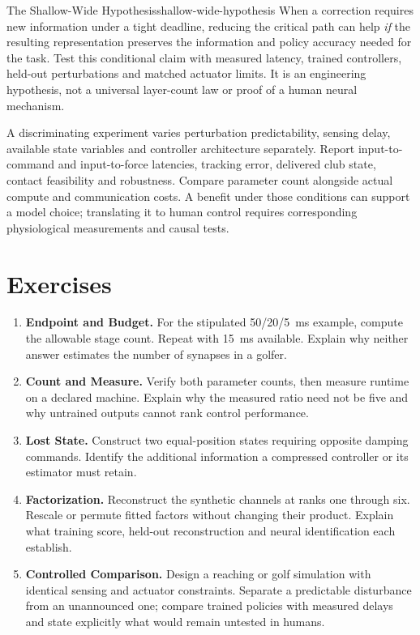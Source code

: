 \begin{insight}{The Shallow-Wide Hypothesis}{shallow-wide-hypothesis}
When a correction requires new information under a tight deadline, reducing the
critical path can help \emph{if} the resulting representation preserves the
information and policy accuracy needed for the task. Test this conditional
claim with measured latency, trained controllers, held-out perturbations and
matched actuator limits. It is an engineering hypothesis, not a universal
layer-count law or proof of a human neural mechanism.
\end{insight}

A discriminating experiment varies perturbation predictability, sensing delay,
available state variables and controller architecture separately. Report
input-to-command and input-to-force latencies, tracking error, delivered club
state, contact feasibility and robustness. Compare parameter count alongside
actual compute and communication costs. A benefit under those conditions can
support a model choice; translating it to human control requires corresponding
physiological measurements and causal tests.

\section*{Exercises}
\begin{enumerate}
 \item \textbf{Endpoint and Budget.} For the stipulated 50/20/5~ms example,
 compute the allowable stage count. Repeat with 15~ms available. Explain
 why neither answer estimates the number of synapses in a golfer.
 \item \textbf{Count and Measure.} Verify both parameter counts, then measure
 runtime on a declared machine. Explain why the measured ratio need not be
 five and why untrained outputs cannot rank control performance.
 \item \textbf{Lost State.} Construct two equal-position states requiring
 opposite damping commands. Identify the additional information a compressed
 controller or its estimator must retain.
 \item \textbf{Factorization.} Reconstruct the synthetic channels at ranks one
 through six. Rescale or permute fitted factors without changing their product.
 Explain what training score, held-out reconstruction and neural identification
 each establish.
 \item \textbf{Controlled Comparison.} Design a reaching or golf simulation
 with identical sensing and actuator constraints. Separate a predictable
 disturbance from an unannounced one; compare trained policies with measured
 delays and state explicitly what would remain untested in humans.
\end{enumerate}
